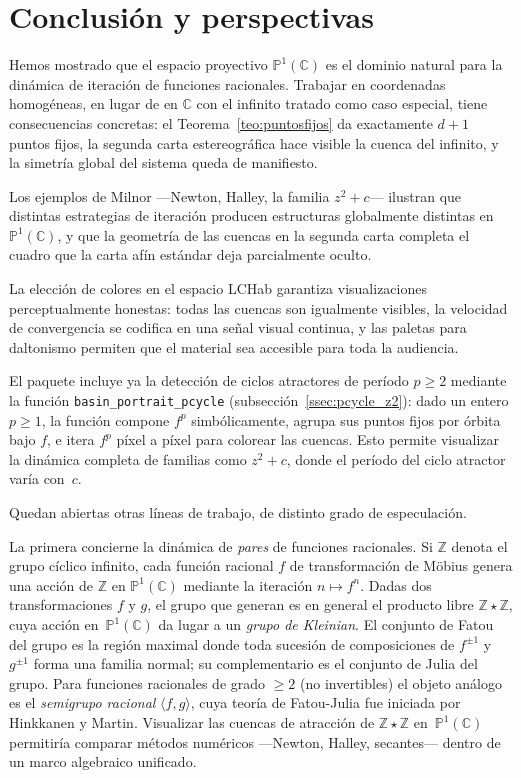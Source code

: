 \documentclass[11pt,a4paper]{article}
\theoremstyle{plain}
\theoremstyle{definition}
\theoremstyle{remark}
\newcommand{\C}{\mathbb{C}}
\newcommand{\Puno}{\mathbb{P}^1(\mathbb{C})}
\newcommand{\fn}[1]{\texttt{#1}}
\begin{document}
\section{Conclusión y perspectivas}
\label{sec:conclusion}

Hemos mostrado que el espacio proyectivo $\Puno$ es el dominio natural
para la dinámica de iteración de funciones racionales.
Trabajar en coordenadas homogéneas, en lugar de en $\C$ con el infinito
tratado como caso especial, tiene consecuencias concretas: el
Teorema~\ref{teo:puntosfijos} da exactamente $d+1$ puntos fijos, la
segunda carta estereográfica hace visible la cuenca del infinito, y la
simetría global del sistema queda de manifiesto.

Los ejemplos de Milnor —Newton, Halley, la familia $z^2+c$— ilustran
que distintas estrategias de iteración producen estructuras globalmente
distintas en~$\Puno$, y que la geometría de las cuencas en la segunda
carta completa el cuadro que la carta afín estándar deja parcialmente
oculto.

La elección de colores en el espacio LCHab garantiza visualizaciones
perceptualmente honestas: todas las cuencas son igualmente visibles,
la velocidad de convergencia se codifica en una señal visual continua,
y las paletas para daltonismo permiten que el material sea accesible
para toda la audiencia.

El paquete incluye ya la detección de ciclos atractores de período
$p\geq 2$ mediante la función \fn{basin\_portrait\_pcycle}
(subsección~\ref{ssec:pcycle_z2}): dado un entero $p\geq 1$, la
función compone $f^p$ simbólicamente, agrupa sus puntos fijos por
órbita bajo $f$, e itera $f^p$ píxel a píxel para colorear las cuencas.
Esto permite visualizar la dinámica completa de familias como $z^2+c$,
donde el período del ciclo atractor varía con~$c$.

Quedan abiertas otras líneas de trabajo, de distinto grado de
especulación.

La primera concierne la dinámica de \emph{pares} de funciones
racionales.
Si $\mathbb{Z}$ denota el grupo cíclico infinito, cada función
racional $f$ de transformación de Möbius genera una acción de
$\mathbb{Z}$ en $\Puno$ mediante la iteración $n\mapsto f^n$.
Dadas dos transformaciones $f$ y $g$, el grupo que generan es en
general el producto libre $\mathbb{Z}\star\mathbb{Z}$,
cuya acción en~$\Puno$ da lugar a un \emph{grupo de Kleinian}.
El conjunto de Fatou del grupo es la región maximal donde toda
sucesión de composiciones de $f^{\pm 1}$ y $g^{\pm 1}$ forma una
familia normal; su complementario es el conjunto de Julia del grupo.
Para funciones racionales de grado $\geq 2$ (no invertibles) el
objeto análogo es el \emph{semigrupo racional} $\langle f,g\rangle$,
cuya teoría de Fatou-Julia fue iniciada por Hinkkanen y Martin.
Visualizar las cuencas de atracción de $\mathbb{Z}\star\mathbb{Z}$
en~$\Puno$ permitiría comparar métodos numéricos —Newton, Halley,
secantes— dentro de un marco algebraico unificado.
\end{document}
